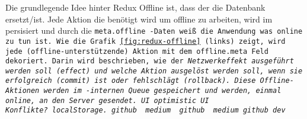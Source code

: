 Die grundlegende Idee hinter Redux Offline ist, dass der  die Datenbank ersetzt/ist. Jede Aktion die benötigt wird um offline zu arbeiten, wird im  persisiert und durch die \tt{meta.offline} -Daten weiß die Anwendung was online zu tun ist. Wie die Grafik \ref{fig:redux-offline} (links) zeigt, wird jede (offline-unterstützende) Aktion mit dem \tt{offline.meta} Feld dekoriert. Darin wird beschrieben, wie der \it{Netzwerkeffekt} ausgeführt werden soll (\tt{effect}) und welche Aktion ausgelöst werden soll, wenn sie erfolgreich (\tt{commit}) ist oder fehlschlägt (\tt{rollback}). Diese Offline-Aktionen werden im -internen \gls{Queue} gespeichert und werden, einmal online, an den Server gesendet. \gls{UI} \gls{optimistic UI}\\

{\LARGE Konflikte?}
  localStorage. github~\cite{redux-persist-gh} medium~\cite{redux-persist}
  github \cite{rn-offline-gh} medium\cite{rn-offline-medium}
  github\cite{webpack-gh}
  dev\cite{webpack-dev}
  \cite{hoodie}